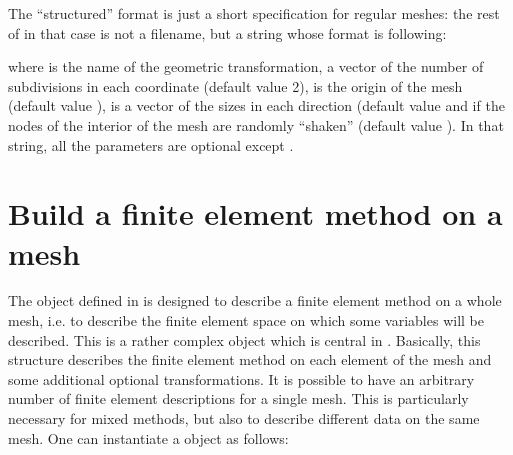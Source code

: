 \documentclass[a4paper,11pt,english]{sphinxmanual}
\begin{document}
The “structured” format is just a short specification for regular meshes:
the rest of  in that case is not a filename, but a string
whose format is following:

\begin{sphinxVerbatim}[commandchars=\\\{\}]
                     
\end{sphinxVerbatim}

where  is the name of the geometric transformation,  a
vector of the number of subdivisions in each coordinate (default value 2),
 is the origin of the mesh (default value \sphinxcode{\sphinxupquote{{[}0,0,...{]}}}), 
is a vector of the sizes in each direction (default value \sphinxcode{\sphinxupquote{{[}1, 1, ...{]}}}
and if  the nodes of the interior of the mesh are randomly
“shaken” (default value ). In that string, all the parameters
are optional except .

\ignorespaces 

\chapter{Build a finite element method on a mesh}
\label{\detokenize{userdoc/bfem:build-a-finite-element-method-on-a-mesh}}\label{\detokenize{userdoc/bfem:ud-bfem}}\label{\detokenize{userdoc/bfem:index-0}}\label{\detokenize{userdoc/bfem::doc}}
The object  defined in  is designed to
describe a finite element method on a whole mesh, i.e. to describe the finite
element space on which some variables will be described. This is a rather complex
object which is central in . Basically, this structure describes the finite
element method on each element of the mesh and some additional optional
transformations. It is possible to have an arbitrary number of finite element
descriptions for a single mesh. This is particularly necessary for mixed methods,
but also to describe different data on the same mesh. One can instantiate a
 object as follows:
\end{document}
